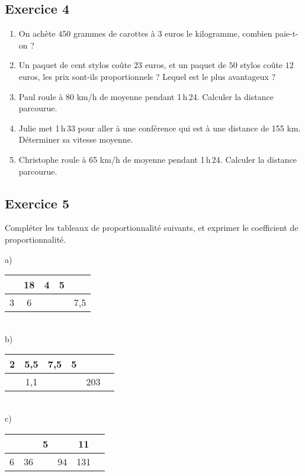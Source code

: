 \documentclass[12 pt]{extarticle}
\theoremstyle{plain}
\begin{document}
\subsection*{Exercice 4}
\begin{enumerate}
\item On achète $450$ grammes de carottes à $3$ euros le kilogramme, combien paie-t-on ? 

\item Un paquet de cent stylos coûte $23$ euros, et un paquet de $50$ 
stylos coûte $12$ euros, les prix sont-ils proportionnels ? Lequel est le plus avantageux ?
	\item Paul roule à 80 km/h de moyenne pendant 1\,h\,24. Calculer la distance parcourue.
	\item Julie met 1\,h\,33 pour aller à une conférence qui est à une distance de 155 km. Déterminer sa vitesse moyenne.
	\item Christophe roule à 65 km/h de moyenne pendant 1\,h\,24. Calculer la distance parcourue.
\end{enumerate}  


 \subsection*{Exercice 5}

Compléter les tableaux de proportionnalité suivants, et exprimer le coefficient de proportionnalité. 

a) \begin{tabular}{ | c |c | c| c|c| }\hline
 & 18  & 4 & 5 & \\
 \hline
 3 & 6 &  &  & 7,5 \\ \hline
\end{tabular} 

 \ \\ 
 
b) \begin{tabular}{|c | c | c | c | c | c}
\hline
2 & 5,5  & 7,5 &  5 &  \\
\hline
 & 1,1 & & &203 \\ \hline

\end{tabular}

 \ \\ 
 
 
c) \begin{tabular}{|c | c | c | c | c | c}
\hline
&  & 5 &   & 11      \\
\hline
6& 36 &  & 94  & 131  \\ \hline

\end{tabular}
\end{document}
